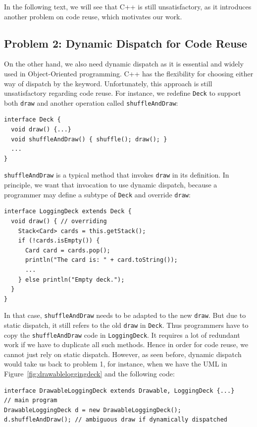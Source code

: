 In the following text, we will see that C++ is still unsatisfactory, as it introduces another problem on code reuse, which motivates
our work.

\subsection{Problem 2: Dynamic Dispatch for Code Reuse}\label{subsec:problem2}

On the other hand, we also need dynamic dispatch as it is essential and widely used in Object-Oriented programming.
C++ has the flexibility for choosing either way of dispatch by the \kwvirtual{} keyword.
Unfortunately, this approach is still unsatisfactory regarding code reuse. For instance, 
we redefine \lstinline|Deck| to support
both \lstinline|draw| and another operation called \lstinline|shuffleAndDraw|:
\vspace{3pt}\begin{lstlisting}
interface Deck {
  void draw() {...}
  void shuffleAndDraw() { shuffle(); draw(); }
  ...
}
\end{lstlisting}\vspace{3pt}
\lstinline|shuffleAndDraw| is a typical method that invokes \lstinline|draw| in its definition. In principle, we want
that invocation to use dynamic dispatch, because a programmer may define a subtype of \lstinline|Deck| and override \lstinline|draw|:
\vspace{3pt}\begin{lstlisting}
interface LoggingDeck extends Deck {
  void draw() { // overriding
    Stack<Card> cards = this.getStack();
    if (!cards.isEmpty()) {
      Card card = cards.pop();
      println("The card is: " + card.toString());
      ...
    } else println("Empty deck.");
  }
}
\end{lstlisting}\vspace{3pt}
In that case, \lstinline|shuffleAndDraw| needs to be adapted to the new \lstinline|draw|. But due to static dispatch,
it still refers to the old \lstinline|draw| in \lstinline|Deck|. Thus programmers have to copy the \lstinline|shuffleAndDraw| code in
\lstinline|LoggingDeck|. It requires a lot of redundant work if we have to duplicate all such methods. Hence in order for code reuse,
we cannot just rely on static dispatch. However, as seen before, dynamic dispatch would take us back to problem 1, for instance, when we
have the UML in Figure~\ref{fig:drawableloggingdeck} and the following code:
\vspace{3pt}\begin{lstlisting}
interface DrawableLoggingDeck extends Drawable, LoggingDeck {...}
// main program
DrawableLoggingDeck d = new DrawableLoggingDeck();
d.shuffleAndDraw(); // ambiguous draw if dynamically dispatched
\end{lstlisting}\vspace{3pt}

